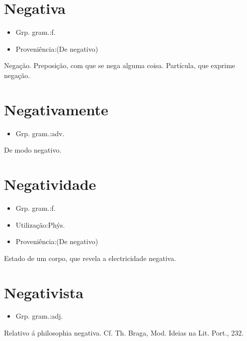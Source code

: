 \section{Negativa}
\begin{itemize}
\item {Grp. gram.:f.}
\end{itemize}
\begin{itemize}
\item {Proveniência:(De \textunderscore negativo\textunderscore )}
\end{itemize}
Negação.
Preposição, com que se nega alguma coisa.
Partícula, que exprime negação.
\section{Negativamente}
\begin{itemize}
\item {Grp. gram.:adv.}
\end{itemize}
De modo negativo.
\section{Negatividade}
\begin{itemize}
\item {Grp. gram.:f.}
\end{itemize}
\begin{itemize}
\item {Utilização:Phýs.}
\end{itemize}
\begin{itemize}
\item {Proveniência:(De \textunderscore negativo\textunderscore )}
\end{itemize}
Estado de um corpo, que revela a electricidade negativa.
\section{Negativista}
\begin{itemize}
\item {Grp. gram.:adj.}
\end{itemize}
Relativo á philosophia negativa. Cf. Th. Braga, \textunderscore Mod. Ideias na Lit. Port.\textunderscore , 232.
